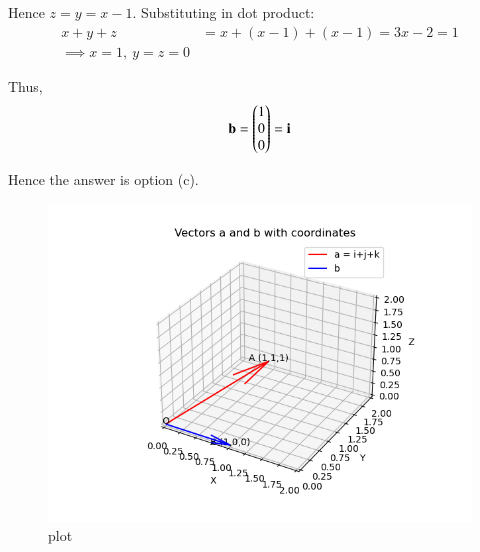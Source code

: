 \documentclass[journal]{IEEEtran}
\begin{document}
Hence $z=y=x-1$.  
Substituting in dot product:
\begin{align}
x+y+z &= x+(x-1)+(x-1) = 3x-2 = 1 \\
\implies x=1,\ y=z=0
\end{align}

Thus,
\begin{align}
\mathbf{b}=\begin{pmatrix}1\\0\\0\end{pmatrix}=\mathbf{i}
\end{align}

Hence the answer is option (c).
\begin{figure}[H]
\centering
\includegraphics[width=0.75\columnwidth]{figs/5.png}
\caption{\centering plot}
\label{fig:placeholder_125}
\end{figure}
\end{document}
